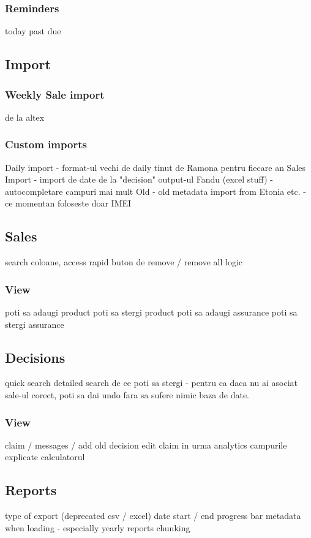 		\subsubsection{Reminders}
				today
				past due
	\subsection{Import}
		\subsubsection{Weekly Sale import}
			de la altex
		\subsubsection{Custom imports}
			Daily import - format-ul vechi de daily tinut de Ramona pentru fiecare an
			Sales Import - import de date de la "decision" output-ul Fandu (excel stuff) - autocompletare campuri mai mult
			Old - old metadata import from Etonia etc. - ce momentan foloseste doar IMEI
	\subsection{Sales}
		search coloane, access rapid
		buton de remove / remove all logic
		\subsubsection{View}
				poti sa adaugi product
				poti sa stergi product
				poti sa adaugi assurance
				poti sa stergi assurance
	\subsection{Decisions}
		quick search
		detailed search
		de ce poti sa stergi - pentru ca daca nu ai asociat sale-ul corect, poti sa dai undo fara sa sufere nimic baza de date.
		\subsubsection{View}
				claim / messages / add old decision
				edit claim in urma analytics
				campurile explicate
				calculatorul
	\subsection{Reports}
		type of export (deprecated csv / excel)
		date start / end
		progress bar
		metadata when loading - especially yearly reports
		chunking
